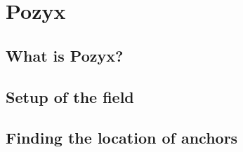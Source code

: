 \section{Pozyx}

\subsection{What is Pozyx?}

\subsection{Setup of the field}

\subsection{Finding the location of anchors}
